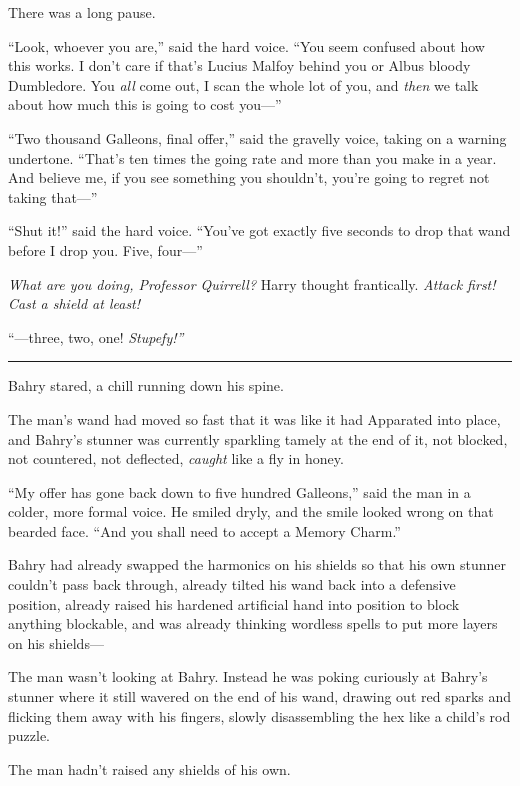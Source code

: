 There was a long pause.

``Look, whoever you are,'' said the hard voice. ``You seem confused
about how this works. I don't care if that's Lucius Malfoy behind you or
Albus bloody Dumbledore. You \emph{all} come out, I scan the whole lot
of you, and \emph{then} we talk about how much this is going to cost
you---''

``Two thousand Galleons, final offer,'' said the gravelly voice, taking
on a warning undertone. ``That's ten times the going rate and more than
you make in a year. And believe me, if you see something you shouldn't,
you're going to regret not taking that---''

``Shut it!'' said the hard voice. ``You've got exactly five seconds to
drop that wand before I drop you. Five, four---''

\emph{What are you doing, Professor Quirrell?} Harry thought
frantically. \emph{Attack first! Cast a shield at least!}

``---three, two, one! \emph{Stupefy!''}

\begin{center}\rule{3in}{0.4pt}\end{center}

Bahry stared, a chill running down his spine.

The man's wand had moved so fast that it was like it had Apparated into
place, and Bahry's stunner was currently sparkling tamely at the end of
it, not blocked, not countered, not deflected, \emph{caught} like a fly
in honey.

``My offer has gone back down to five hundred Galleons,'' said the man
in a colder, more formal voice. He smiled dryly, and the smile looked
wrong on that bearded face. ``And you shall need to accept a Memory
Charm.''

Bahry had already swapped the harmonics on his shields so that his own
stunner couldn't pass back through, already tilted his wand back into a
defensive position, already raised his hardened artificial hand into
position to block anything blockable, and was already thinking wordless
spells to put more layers on his shields---

The man wasn't looking at Bahry. Instead he was poking curiously at
Bahry's stunner where it still wavered on the end of his wand, drawing
out red sparks and flicking them away with his fingers, slowly
disassembling the hex like a child's rod puzzle.

The man hadn't raised any shields of his own.

